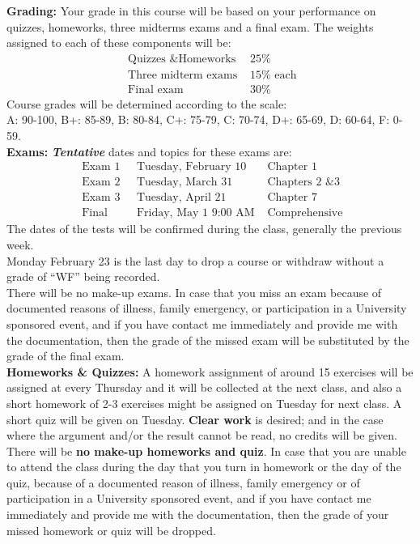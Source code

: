 \documentclass[11pt]{amsart}
\begin{document}
{\bf Grading:} Your grade in this course will be based on your performance on  quizzes, homeworks, three midterms 
exams and a final exam. The weights assigned to each of these components will be:
\[
\begin{array} {ll}
\mbox{ Quizzes \& Homeworks } & 25 \% \\
\mbox{ Three midterm exams } & 15 \% \mbox{ each} \\
\mbox{ Final exam } & 30 \%
\end{array}
\]
Course grades will be determined according to the scale:\\
A: 90-100, B+: 85-89, B: 80-84, C+: 75-79, C: 70-74, D+: 65-69, D: 60-64, F: 0-59.\\[0.3cm]
{\bf Exams:} {\em \bf Tentative} dates and topics for these exams are:
\[
\begin{array}{lll}
\mbox{ Exam 1 } & \mbox{ Tuesday, February 10} & \mbox{ Chapter } 1 \\
\mbox{ Exam 2 } & \mbox{ Tuesday, March 31} & \mbox{ Chapters 2 \& 3}\\
\mbox{ Exam 3 } & \mbox{ Tuesday, April 21} & \mbox{ Chapter } 7\\
\mbox{ Final} & \mbox{ Friday, May 1 9:00 AM}  & \mbox{ Comprehensive}
\end{array}
\]
The dates of the tests will be confirmed during the class, generally the previous week.\\
Monday February 23 is the last day to drop a course or withdraw without a grade of ``WF'' being recorded.\\
There will be no make-up exams. In case that you miss an exam because of  documented reasons of illness, family emergency, or participation in a University sponsored event, and if you have contact me immediately and provide me with the documentation, then the grade of the missed exam will be substituted by the grade of the final exam.\\[0.3cm]
{\bf Homeworks \& Quizzes:} A homework assignment of around 15 exercises will be assigned at every Thursday and it will be collected at the next class, and also a short homework of 2-3 exercises might be assigned on Tuesday for next class.
A short quiz will be given on Tuesday. \textbf{Clear work} is desired; and in the case where the argument and/or the result cannot be read, no credits will be given.\\
There will be  \textbf{no make-up homeworks and quiz}. In case that you are unable to attend the class during the day that you turn in homework or the day of the quiz, because of a documented reason of illness, family emergency or of participation in a University sponsored event, and if you have contact me immediately and provide me with the documentation, then the grade of your missed homework or quiz will be dropped.\\[0.3cm]
\end{document}
